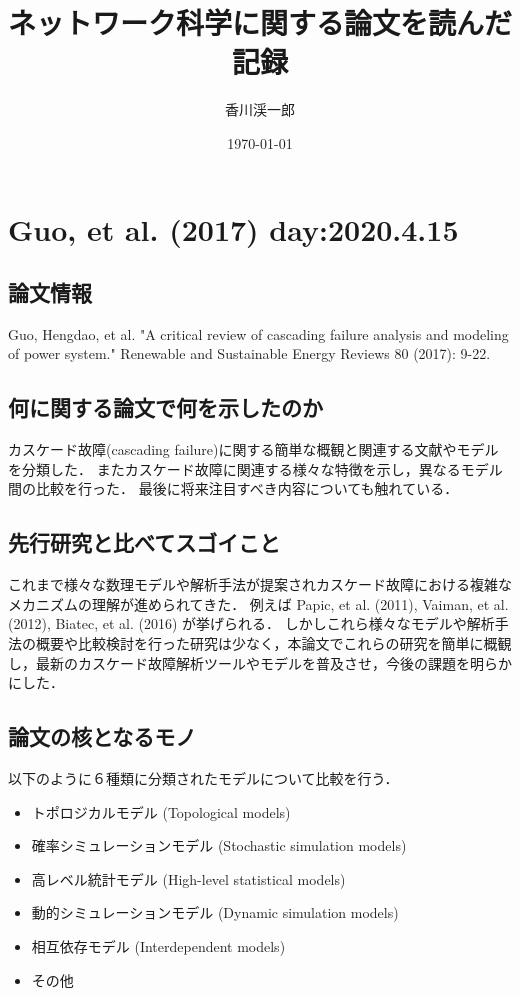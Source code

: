 \documentclass[a4paper,11pt]{jsarticle}
\begin{document}
\title{ネットワーク科学に関する論文を読んだ記録}
\author{香川渓一郎}
\date{\today}
\maketitle
\section{Guo, et al. (2017) day:2020.4.15}
    \subsection{論文情報}
    Guo, Hengdao, et al. "A critical review of cascading failure analysis and modeling of power system." Renewable and Sustainable Energy Reviews 80 (2017): 9-22.
    \subsection{何に関する論文で何を示したのか}
    カスケード故障(cascading failure)に関する簡単な概観と関連する文献やモデルを分類した．
    またカスケード故障に関連する様々な特徴を示し，異なるモデル間の比較を行った．
    最後に将来注目すべき内容についても触れている．
    \subsection{先行研究と比べてスゴイこと}
    これまで様々な数理モデルや解析手法が提案されカスケード故障における複雑なメカニズムの理解が進められてきた．
    例えば Papic, et al. (2011), Vaiman, et al. (2012), Biatec, et al. (2016) が挙げられる．
    しかしこれら様々なモデルや解析手法の概要や比較検討を行った研究は少なく，本論文でこれらの研究を簡単に概観し，最新のカスケード故障解析ツールやモデルを普及させ，今後の課題を明らかにした．
    \subsection{論文の核となるモノ}
    以下のように６種類に分類されたモデルについて比較を行う．
    \begin{itemize}
      \item トポロジカルモデル (Topological models)
      \item 確率シミュレーションモデル (Stochastic simulation models)
      \item 高レベル統計モデル (High-level statistical models)
      \item 動的シミュレーションモデル (Dynamic simulation models)
      \item 相互依存モデル (Interdependent models)
      \item その他
    \end{itemize}
\end{document}
